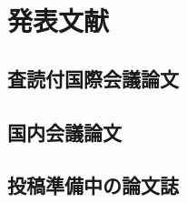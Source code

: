 \documentclass[fleqn]{jreport}
\begin{document}
\chapter*{発表文献}

\section*{査読付国際会議論文}

\section*{国内会議論文}

\section*{投稿準備中の論文誌}
\end{document}
